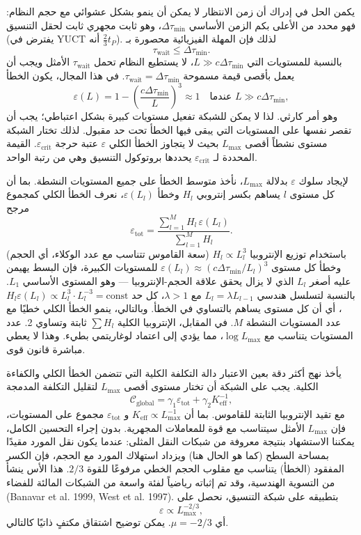 \documentclass[11pt,a4paper]{article}
\begin{document}
	يكمن الحل في إدراك أن زمن الانتظار لا يمكن أن ينمو بشكل عشوائي مع حجم النظام: فهو محدد من الأعلى بكم الزمن الأساسي \(\Delta\tau_{\min}\)، وهو ثابت مجهري ثابت لحقل التنسيق (يفترض في YUCT أنه \(\frac23 t_P\)). لذلك فإن المهلة الفيزيائية محصورة بـ
	\[
	\tau_{\mathrm{wait}} \le \Delta\tau_{\min}.
	\]
	بالنسبة للمستويات التي \(L \gg c\Delta\tau_{\min}\)، لا يستطيع النظام تحمل \(\tau_{\mathrm{wait}}\) الأمثل ويجب أن يعمل بأقصى قيمة مسموحة \(\tau_{\mathrm{wait}} = \Delta\tau_{\min}\). في هذا المجال، يكون الخطأ
	\[
	\varepsilon(L) = 1 - \left(\frac{c\Delta\tau_{\min}}{L}\right)^3 \approx 1 \quad\text{عندما } L \gg c\Delta\tau_{\min},
	\]
	وهو أمر كارثي. لذا لا يمكن للشبكة تفعيل مستويات كبيرة بشكل اعتباطي؛ يجب أن تقصر نفسها على المستويات التي يبقى فيها الخطأ تحت حد مقبول. لذلك تختار الشبكة مستوى نشطاً أقصى \(L_{\max}\) بحيث لا يتجاوز الخطأ الكلي \(\varepsilon\) عتبة حرجة \(\varepsilon_{\mathrm{crit}}\). القيمة المحددة لـ \(\varepsilon_{\mathrm{crit}}\) يحددها بروتوكول التنسيق وهي من رتبة الواحد.
	
	لإيجاد سلوك \(\varepsilon\) بدلالة \(L_{\max}\)، نأخذ متوسط الخطأ على جميع المستويات النشطة. بما أن كل مستوى \(l\) يساهم بكسر إنتروبي \(H_l\) وخطأ \(\varepsilon(L_l)\)، نعرف الخطأ الكلي كمجموع مرجح
	\[
	\varepsilon_{\mathrm{tot}} = \frac{\sum_{l=1}^{M} H_l\, \varepsilon(L_l)}{\sum_{l=1}^{M} H_l}.
	\]
	باستخدام توزيع الإنتروبيا \(H_l \propto L_l^3\) (سعة القاموس تتناسب مع عدد الوكلاء، أي الحجم) وخطأ كل مستوى \(\varepsilon(L_l) \approx (c\Delta\tau_{\min}/L_l)^3\) للمستويات الكبيرة، فإن البسط يهيمن عليه أصغر \(L_l\) الذي لا يزال يحقق علاقة الحجم-الإنتروبيا — وهو المستوى الأساسي \(L_1\). بالنسبة لتسلسل هندسي \(L_l = \lambda L_{l-1}\) مع \(\lambda > 1\)، كل حد \(H_l\varepsilon(L_l) \propto L_l^3 \cdot L_l^{-3} = \text{const}\)، أي أن كل مستوى يساهم بالتساوي في الخطأ. وبالتالي، ينمو الخطأ الكلي خطيًا مع عدد المستويات النشطة \(M\). في المقابل، الإنتروبيا الكلية \(\sum H_l\) ثابتة وتساوي 2. عدد المستويات يتناسب مع \(\log L_{\max}\)، مما يؤدي إلى اعتماد لوغاريتمي بطيء. وهذا لا يعطي مباشرة قانون قوى.
	
	يأخذ نهج أكثر دقة بعين الاعتبار دالة التكلفة الكلية التي تتضمن الخطأ الكلي والكفاءة الكلية. يجب على الشبكة أن تختار مستوى أقصى \(L_{\max}\) لتقليل التكلفة المدمجة
	\[
	\mathcal{C}_{\mathrm{global}} = \gamma_1 \varepsilon_{\mathrm{tot}} + \gamma_2 K_{\mathrm{eff}}^{-1},
	\]
	مع تقيد الإنتروبيا الثابتة للقاموس. بما أن \(K_{\mathrm{eff}} \propto L_{\max}^{-1}\) و \(\varepsilon_{\mathrm{tot}}\) مجموع على المستويات، فإن \(L_{\max}\) الأمثل سيتناسب مع قوة للمعاملات المجهرية. بدون إجراء التحسين الكامل، يمكننا الاستشهاد بنتيجة معروفة من شبكات النقل المثلى: عندما يكون نقل المورد مقيدًا بمساحة السطح (كما هو الحال هنا) ويزداد استهلاك المورد مع الحجم، فإن الكسر المفقود (الخطأ) يتناسب مع مقلوب الحجم الخطي مرفوعًا للقوة \(2/3\). هذا الأس ينشأ من التسوية الهندسية، وقد تم إثباته رياضياً لفئة واسعة من الشبكات المالئة للفضاء (Banavar et al. 1999, West et al. 1997). بتطبيقه على شبكة التنسيق، نحصل على
	\[
	\varepsilon \propto L_{\max}^{-2/3},
	\]
	أي \(\mu = -2/3\). يمكن توضيح اشتقاق مكتفٍ ذاتيًا كالتالي.
	
\end{document}
